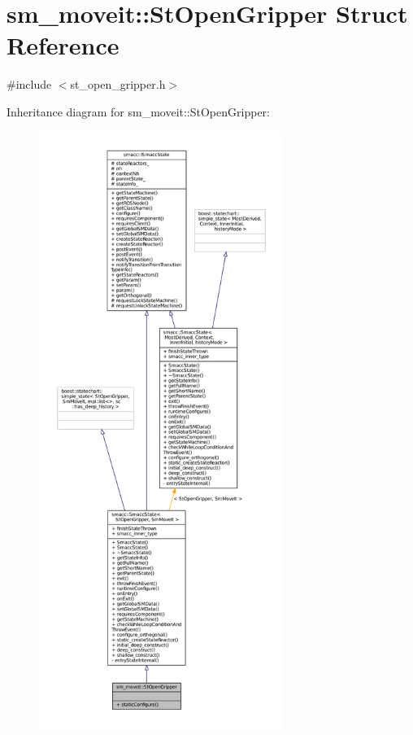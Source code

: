 \hypertarget{structsm__moveit_1_1StOpenGripper}{}\section{sm\+\_\+moveit\+:\+:St\+Open\+Gripper Struct Reference}
\label{structsm__moveit_1_1StOpenGripper}


{\ttfamily \#include $<$st\+\_\+open\+\_\+gripper.\+h$>$}



Inheritance diagram for sm\+\_\+moveit\+:\+:St\+Open\+Gripper\+:
\nopagebreak
\begin{figure}[H]
\begin{center}
\leavevmode
\includegraphics[height=550pt]{structsm__moveit_1_1StOpenGripper__inherit__graph}
\end{center}
\end{figure}


